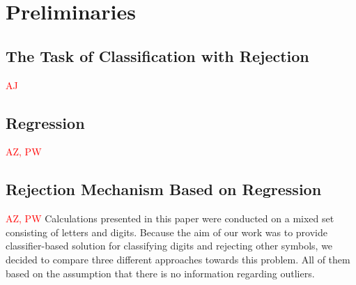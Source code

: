 \documentclass{llncs}
\begin{document}
\section{Preliminaries}
  \label{sec:preliminaries}

\subsection{The Task of Classification with Rejection}
\textcolor{red} {AJ}


\subsection{Regression}
\textcolor{red} {AZ, PW}



\subsection{Rejection Mechanism Based on Regression}
\textcolor{red} {AZ, PW}
Calculations presented in this paper were conducted on a mixed set consisting of letters and digits. Because the aim of our work was to provide classifier-based solution for classifying digits and rejecting other symbols, we decided to compare three different approaches towards this problem. All of them based on the assumption that there is no information regarding outliers. \\
\end{document}
